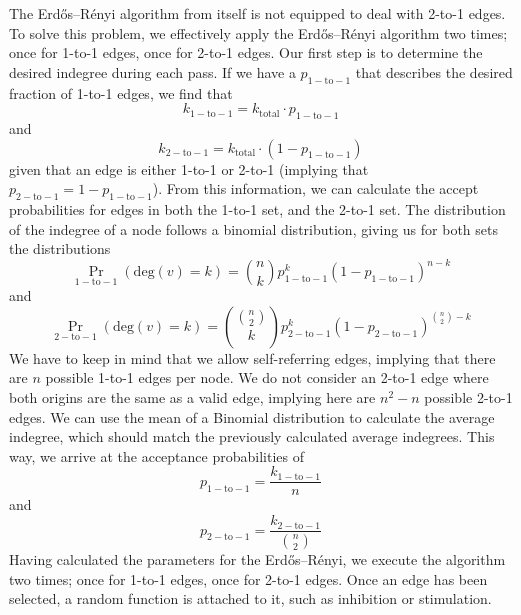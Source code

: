 \documentclass[../main.tex]{subfiles}
\begin{document}
The Erdős–Rényi algorithm from itself is not equipped to deal with 2-to-1 edges.
To solve this problem, we effectively apply the Erdős–Rényi algorithm two times; once for 1-to-1 edges, once for 2-to-1 edges.
Our first step is to determine the desired indegree during each pass.
If we have a $p_\mathrm{1-to-1}$ that describes the desired fraction of 1-to-1 edges, we find that
%
\begin{equation}
k_\mathrm{1-to-1} = k_\mathrm{total} \cdot p_\mathrm{1-to-1}
\end{equation}
%
and
%
\begin{equation}
k_\mathrm{2-to-1} = k_\mathrm{total} \cdot (1 - p_\mathrm{1-to-1})
\end{equation}
%
given that an edge is either 1-to-1 or 2-to-1 (implying that $p_\mathrm{2-to-1} = 1 -  p_\mathrm{1-to-1}$).
From this information, we can calculate the accept probabilities for edges in both the 1-to-1 set, and the 2-to-1 set.
The distribution of the indegree of a node follows a binomial distribution, giving us for both sets the distributions
%
\begin{equation}
\Pr_\mathrm{1-to-1} \left( \mathrm{deg}(v) = k \right) = \binom{n}{k} p_\mathrm{1-to-1}^k (1 - p_\mathrm{1-to-1})^{n-k}
\end{equation}
%
and
%
\begin{equation}
\Pr_\mathrm{2-to-1} \left( \mathrm{deg}(v) = k\right) = \binom{\binom{n}{2}}{k} p_\mathrm{2-to-1}^k (1 - p_\mathrm{2-to-1})^{\binom{n}{2} - k}
\end{equation}
%
We have to keep in mind that we allow self-referring edges, implying that there are $n$ possible 1-to-1 edges per node.
We do not consider an 2-to-1 edge where both origins are the same as a valid edge, implying here are $n^2 - n$ possible 2-to-1 edges.
We can use the mean of a Binomial distribution to calculate the average indegree, which should match the previously calculated average indegrees.
This way, we arrive at the acceptance probabilities of
%
\begin{equation}
p_\mathrm{1-to-1} = \frac{k_\mathrm{1-to-1}}{n}
\end{equation}
%
and
%
\begin{equation}
p_\mathrm{2-to-1} = \frac{k_\mathrm{2-to-1}}{\binom{n}{2}}
\end{equation}
%
Having calculated the parameters for the Erdős–Rényi, we execute the algorithm two times; once for 1-to-1 edges, once for 2-to-1 edges.
Once an edge has been selected, a random function is attached to it, such as inhibition or stimulation.
\end{document}
